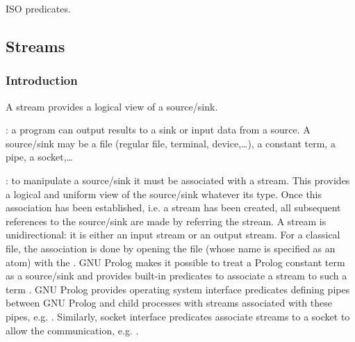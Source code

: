 \begin{PlErrors}





\end{PlErrors}

\Portability

ISO predicates.

\subsection{Streams}
\label{Streams}

\subsubsection{Introduction}
\label{Introduction:(Streams)}
A stream provides a logical view of a source/sink.

: a program can output results to a sink or input
data from a source. A source/sink may be a file (regular file, terminal,
device,\ldots), a constant term, a pipe, a socket,\ldots 

: to manipulate a source/sink
it must be associated with a stream. This provides a logical and uniform view
of the source/sink whatever its type. Once this association has been
established, i.e. a stream has been created, all subsequent references to
the source/sink are made by referring the stream. A stream is
unidirectional: it is either an input stream or an output stream. For a
classical file, the association is done by opening the file (whose name is
specified as an atom) with the  . GNU Prolog
makes it possible to treat a Prolog constant term as a source/sink and
provides built-in predicates to associate a stream to such a term
. GNU Prolog provides operating system interface
predicates defining pipes between GNU Prolog and child processes with streams
associated with these pipes, e.g.  .
Similarly, socket interface predicates associate streams to a socket to
allow the communication, e.g. 
.

